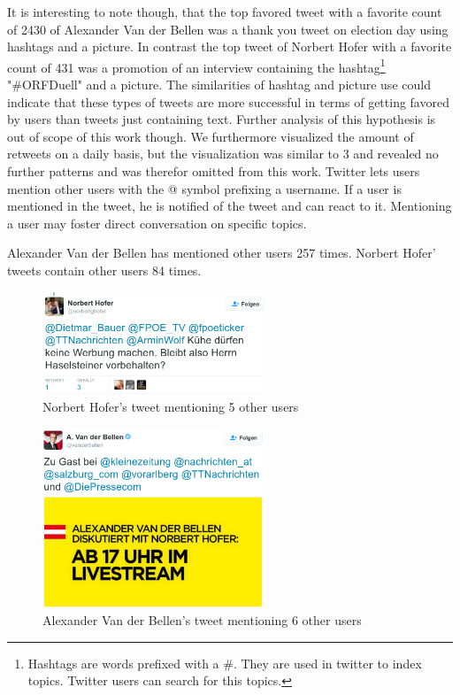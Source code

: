 \documentclass{llncs}
\begin{document}
It is interesting to note though, that the top favored tweet with a favorite count of 2430 of Alexander Van der Bellen was a thank you tweet on election day using hashtags and a picture. In contrast the top tweet of Norbert Hofer with a favorite count of 431 was a promotion of an interview containing the hashtag\footnote{Hashtags are words prefixed with a \#. They are used in twitter to index topics. Twitter users can search for this topics.} "\#ORFDuell" and a picture. The similarities of hashtag and picture use could indicate that these types of tweets are more successful in terms of getting favored by users than tweets just containing text. Further analysis of this hypothesis is out of scope of this work though.
We furthermore visualized the amount of retweets on a daily basis, but the visualization was similar to \figurename{3} and revealed no further patterns and was therefor omitted from this work.
Twitter lets users mention other users with the @ symbol prefixing a username. If a user is mentioned in the tweet, he is notified of the tweet and can react to it. Mentioning a user may foster direct conversation on specific topics. 

Alexander Van der Bellen has mentioned other users 257 times. Norbert Hofer' tweets contain other users 84 times.  

\begin{figure}[htbp] 
	\centering
	\includegraphics[width=0.6\textwidth]{grafics/most_mentioned_hofer.png}
	\caption{Norbert Hofer's tweet mentioning 5 other users}
	\label{fig:Norbert Hofer most mentioned}
\end{figure}
\begin{figure}[htbp] 
	\centering
	\includegraphics[width=0.6\textwidth]{grafics/most_mentioned_vdb.png}
	\caption{Alexander Van der Bellen's tweet mentioning 6 other users}
	\label{fig:Norbert Hofer most mentioned}
\end{figure}
\end{document}
